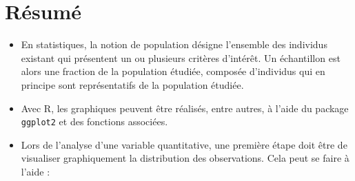 \documentclass[
  french,
]{book}
\begin{document}
\hypertarget{ruxe9sumuxe9-2}{%
\section{Résumé}\label{ruxe9sumuxe9-2}}

\begin{itemize}
\item
  En statistiques, la notion de population désigne l'ensemble des individus existant qui présentent un ou plusieurs critères d'intérêt. Un échantillon est alors une fraction de la population étudiée, composée d'individus qui en principe sont représentatifs de la population étudiée.
\item
  Avec R, les graphiques peuvent être réalisés, entre autres, à l'aide du package \texttt{ggplot2} et des fonctions associées.
\item
  Lors de l'analyse d'une variable quantitative, une première étape doit être de visualiser graphiquement la distribution des observations. Cela peut se faire à l'aide :


\end{itemize}
\end{document}

